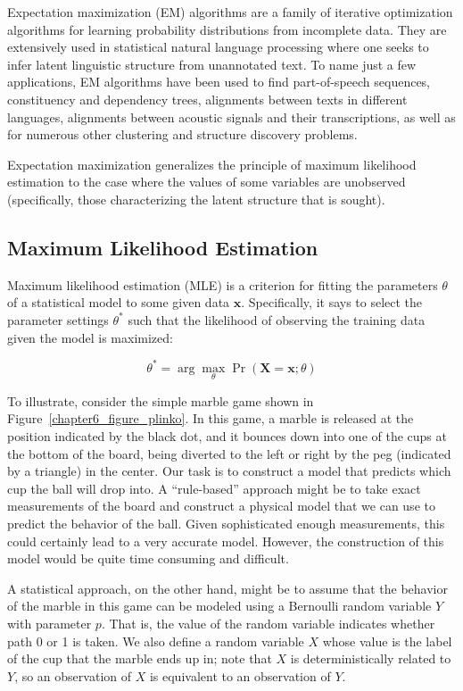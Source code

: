 Expectation maximization (EM) algorithms
\cite{Dempster_Laird_Rubin_1977} are a family of iterative
optimization algorithms for learning probability distributions from
incomplete data.  They are extensively used in statistical natural
language processing where one seeks to infer latent linguistic
structure from unannotated text.  To name just a few applications, EM
algorithms have been used to find part-of-speech sequences,
constituency and dependency trees, alignments between texts in
different languages, alignments between acoustic signals and their
transcriptions, as well as for numerous other clustering and structure
discovery problems.

Expectation maximization generalizes the principle of maximum
likelihood estimation to the case where the values of some variables
are unobserved (specifically, those characterizing the latent
structure that is sought).

\subsection{Maximum Likelihood Estimation}

Maximum likelihood estimation (MLE) is a criterion for fitting the
parameters $\theta$ of a statistical model to some given data
$\textbf{x}$.  Specifically, it says to select the parameter settings
$\theta^*$ such that the likelihood of observing the training data
given the model is maximized:

\begin{equation}
\theta^* = \arg \max_{\theta} \Pr(\textbf{X}=\textbf{x};\theta)
\end{equation}

To illustrate, consider the simple marble game shown in
Figure~\ref{chapter6_figure_plinko}.  In this game, a marble is
released at the position indicated by the black dot, and it bounces
down into one of the cups at the bottom of the board, being diverted
to the left or right by the peg (indicated by a triangle) in the
center.  Our task is to construct a model that predicts which cup the
ball will drop into.  A ``rule-based'' approach might be to take exact
measurements of the board and construct a physical model that we can
use to predict the behavior of the ball.  Given sophisticated enough
measurements, this could certainly lead to a very accurate model.
However, the construction of this model would be quite time consuming
and difficult.

A statistical approach, on the other hand, might be to assume that the
behavior of the marble in this game can be modeled using a Bernoulli
random variable $Y$ with parameter $p$.  That is, the value of the
random variable indicates whether path 0 or 1 is taken.  We also
define a random variable $X$ whose value is the label of the cup that
the marble ends up in; note that $X$ is deterministically related to
$Y$, so an observation of $X$ is equivalent to an observation of $Y$.

